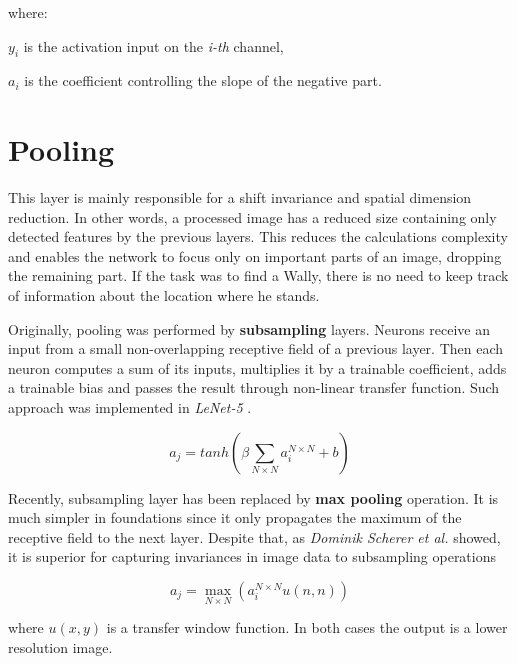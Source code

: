 where:

$y_i$ is the activation input on the \emph{i-th} channel,

$a_i$ is the coefficient controlling the slope of the negative part. 

\section{Pooling}
\label{sec:conv-pooling}

This layer is mainly responsible for a shift invariance and spatial dimension reduction. In other words, a processed image has a reduced size containing only detected features by the previous layers. This reduces the calculations complexity and enables the network to focus only on important parts of an image, dropping the remaining part. If the task was to find a Wally, there is no need to keep track of information about the location where he stands.

Originally, pooling was performed by \textbf{subsampling} layers. Neurons receive an input from a small non-overlapping receptive field of a previous layer. Then each neuron computes a sum of its inputs, multiplies it by a trainable coefficient, adds a trainable bias and passes the result through non-linear transfer function. Such approach was implemented in \emph{LeNet-5} \cite{GradientBasedLearningDigitRec}.

\begin{equation}
    a_j = tanh\left(\beta \sum_{N \times N} a_i^{N \times N} + b \right)
\end{equation}

Recently, subsampling layer has been replaced by \textbf{max pooling} operation. It is much simpler in foundations since it only propagates the maximum of the receptive field to the next layer. Despite that, as \emph{Dominik Scherer et al.} \cite{MaxPool} showed, it is superior for capturing invariances in image data to subsampling operations

\begin{equation}
    a_j = \max_{N \times N} \left( a_i^{N \times N} u(n, n) \right)
\end{equation}

where $u(x, y)$ is a transfer window function. In both cases the output is a lower resolution image.
